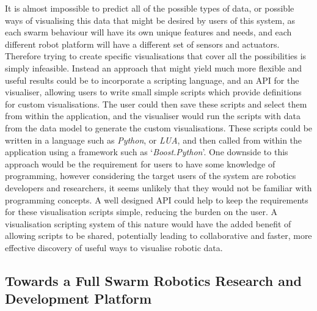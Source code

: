It is almost impossible to predict all of the possible types of data, or possible ways of visualising this data that might be desired by users of this system, as each swarm behaviour will have its own unique features and needs, and each different robot platform will have a different set of sensors and actuators. Therefore trying to create specific visualisations that cover all the possibilities is simply infeasible. Instead an approach that might yield much more flexible and useful results could be to incorporate a scripting language, and an API for the visualiser, allowing users to write small simple scripts which provide definitions for custom visualisations. The user could then save these scripts and select them from within the application, and the visualiser would run the scripts with data from the data model to generate the custom visualisations. These scripts could be written in a language such as \textit{Python}, or \textit{LUA}, and then called from within the application using a framework such as `\textit{Boost.Python}'. One downside to this approach would be the requirement for users to have some knowledge of programming, however considering the target users of the system are robotics developers and researchers, it seems unlikely that they would not be familiar with programming concepts. A well designed API could help to keep the requirements for these visualisation scripts simple, reducing the burden on the user. A visualisation scripting system of this nature would have the added benefit of allowing scripts to be shared, potentially leading to collaborative and faster, more effective discovery of useful ways to visualise robotic data.


\subsection{Towards a Full Swarm Robotics Research and Development Platform}

